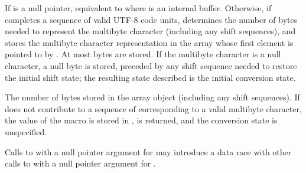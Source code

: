 \begin{itemdescr}
\pnum
\effects
If  is a null pointer, equivalent to
where  is an internal buffer.
Otherwise, if  completes a sequence of valid UTF-8 code units,
determines the number of bytes needed
to represent the multibyte character (including any shift sequences),
and stores the multibyte character representation in the array
whose first element is pointed to by .
At most  bytes are stored.
If the multibyte character is a null character, a null byte is stored,
preceded by any shift sequence needed to restore the initial shift state;
the resulting state described is the initial conversion state.

\pnum
\returns
The number of bytes stored in the array object (including any shift sequences).
If  does not contribute to a sequence of 
corresponding to a valid multibyte character,
the value of the macro  is stored in ,
 is returned, and the conversion state is unspecified.

\pnum
\remarks
Calls to  with a null pointer argument for 
may introduce a data race
with other calls to 
with a null pointer argument for .
\end{itemdescr}
